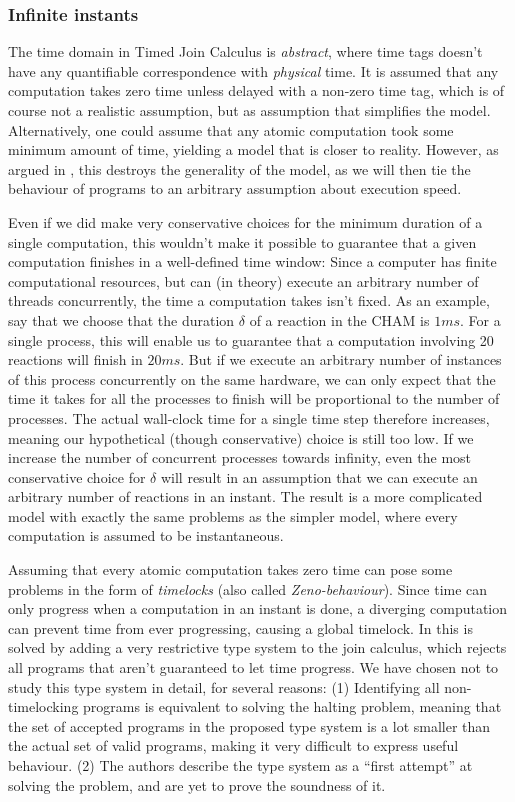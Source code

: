 \subsubsection{Infinite instants}

The time domain in Timed Join Calculus is \emph{abstract}, where time
tags doesn't have any quantifiable correspondence with \emph{physical}
time. It is assumed that any computation takes zero time unless
delayed with a non-zero time tag, which is of course not a realistic
assumption, but as assumption that simplifies the model.
Alternatively, one could assume that any atomic computation took some
minimum amount of time, yielding a model that is closer to reality.
However, as argued in \cite{nicollin-overview}, this destroys the
generality of the model, as we will then tie the behaviour of programs
to an arbitrary assumption about execution speed.

Even if we did make very conservative choices for the minimum duration
of a single computation, this wouldn't make it possible to guarantee
that a given computation finishes in a well-defined time window: Since
a computer has finite computational resources, but can (in theory)
execute an arbitrary number of threads concurrently, the time a
computation takes isn't fixed. As an example, say that we choose that
the duration $\delta$ of a reaction in the CHAM is $1 ms$. For a
single process, this will enable us to guarantee that a computation
involving 20 reactions will finish in $20 ms$. But if we execute an
arbitrary number of instances of this process concurrently on the same
hardware, we can only expect that the time it takes for all the
processes to finish will be proportional to the number of processes.
The actual wall-clock time for a single time step therefore increases,
meaning our hypothetical (though conservative) choice is still too
low. If we increase the number of concurrent processes towards
infinity, even the most conservative choice for $\delta$ will result
in an assumption that we can execute an arbitrary number of reactions
in an instant. The result is a more complicated model with exactly the
same problems as the simpler model, where every computation is assumed
to be instantaneous.

Assuming that every atomic computation takes zero time can pose some
problems in the form of \emph{timelocks} (also called
\emph{Zeno-behaviour}). Since time can only progress when a
computation in an instant is done, a diverging computation can prevent
time from ever progressing, causing a global timelock.  In
\cite{timed-join} this is solved by adding a very restrictive type
system to the join calculus, which rejects all programs that aren't
guaranteed to let time progress. We have chosen not to study this type
system in detail, for several reasons: (1) Identifying all
non-timelocking programs is equivalent to solving the halting problem,
meaning that the set of accepted programs in the proposed type system
is a lot smaller than the actual set of valid programs, making it very
difficult to express useful behaviour. (2) The authors describe the
type system as a ``first attempt'' at solving the problem, and are yet
to prove the soundness of it.


